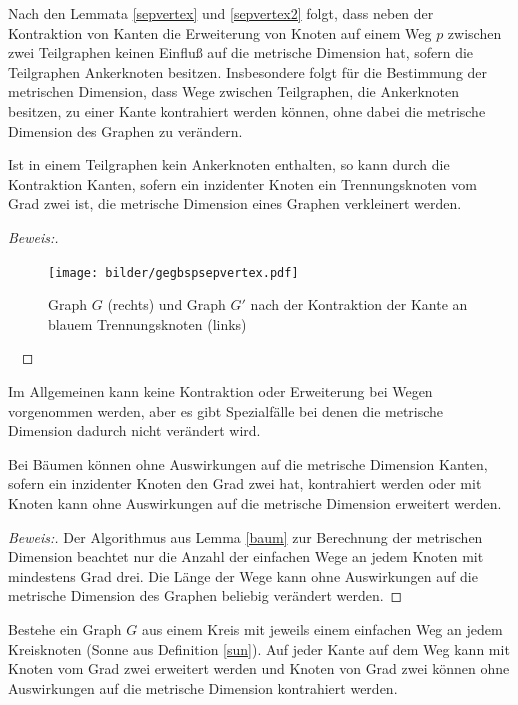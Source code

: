 \begin{bem}
Nach den Lemmata \ref{sepvertex} und \ref{sepvertex2} folgt, dass neben der Kontraktion von Kanten die Erweiterung von Knoten auf einem Weg $p$ zwischen zwei Teilgraphen keinen Einfluß auf die metrische Dimension hat, sofern die Teilgraphen Ankerknoten besitzen. Insbesondere folgt für die Bestimmung der metrischen Dimension, dass Wege zwischen Teilgraphen, die Ankerknoten besitzen, zu einer Kante kontrahiert werden können, ohne dabei die metrische Dimension des Graphen zu verändern.
\end{bem}
\begin{lem}
Ist in einem Teilgraphen kein Ankerknoten enthalten, so kann durch die Kontraktion Kanten, sofern ein inzidenter Knoten ein Trennungsknoten vom Grad zwei ist, die metrische Dimension eines Graphen verkleinert werden.
\end{lem}
\begin{proof}[Beweis:] ~ \newline
\vspace{-7mm}
\begin{figure}[!h]
\centering
\texttt{[image: bilder/gegbspsepvertex.pdf]}
\caption{Graph $G$ (rechts) und Graph $G'$ nach der Kontraktion der Kante an blauem Trennungsknoten (links)}
\end{figure} 
\vspace{-8mm}
~\linebreak
\end{proof}
Im Allgemeinen kann keine Kontraktion oder Erweiterung bei Wegen vorgenommen werden, aber es gibt Spezialfälle bei denen die metrische Dimension dadurch nicht verändert wird.
\begin{lem}
Bei Bäumen können ohne Auswirkungen auf die metrische Dimension Kanten, sofern ein inzidenter Knoten den Grad zwei hat, kontrahiert werden oder mit Knoten kann ohne Auswirkungen auf die metrische Dimension erweitert werden.
\end{lem}
\begin{proof}[Beweis:]
Der Algorithmus aus Lemma \ref{baum} zur Berechnung der metrischen Dimension beachtet nur die Anzahl der einfachen Wege an jedem Knoten mit mindestens Grad drei. Die Länge der Wege kann ohne Auswirkungen auf die metrische Dimension des Graphen beliebig verändert werden.
\end{proof}
\begin{lem}
\label{sonneerweiterung}
Bestehe ein Graph $G$ aus einem Kreis mit jeweils einem einfachen Weg an jedem Kreisknoten (Sonne aus Definition \ref{sun}). Auf jeder Kante auf dem Weg kann mit Knoten vom Grad zwei erweitert werden und Knoten von Grad zwei können ohne Auswirkungen auf die metrische Dimension kontrahiert werden.
\end{lem}

